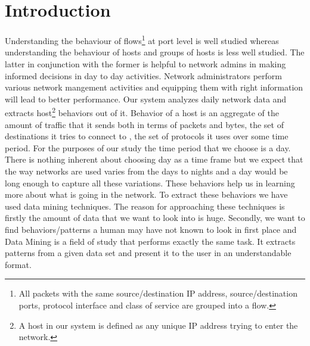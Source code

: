 
\chapter{Introduction}

Understanding the behaviour of flows\footnote{All packets with the same source/destination IP address, source/destination ports, protocol interface and class of service are grouped into a flow.} at port level is well studied whereas understanding the behaviour of hosts and groups of hosts is less well studied. The latter in conjunction with the former is helpful to network admins in making informed decisions in day to day activities. Network administrators perform various network mangement activities and equipping them with right information will lead to better performance. 
Our system analyzes daily network data and extracts host\footnote{A host in our system is defined as any unique IP address trying to enter the network.} behaviors out of it.  Behavior of a host is an aggregate of the amount of traffic that it sends both in terms of packets and bytes, the set of destinations it tries to connect to , the set of protocols it uses over some time period. For the purposes of our study the time period that we choose is a day. There is nothing inherent about choosing day as a time frame but we expect that the way networks are used varies from the days to nights and a day would be long enough to capture all these variations. These behaviors help us in learning more about what is going in the network. To extract these behaviors we have used data mining techniques. The reason for approaching these techniques is firstly the amount of data that we want to look into is huge. Secondly, we want to find behaviors/patterns a human may have not known to look in first place and Data Mining is a field of study that performs exactly the same task. It extracts patterns from a given data set and present it to the user in an understandable format.

